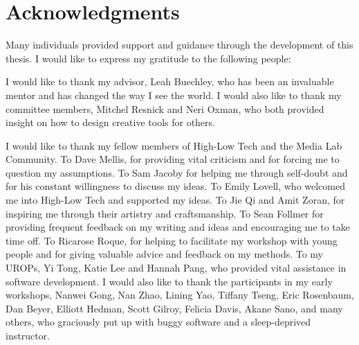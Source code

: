 \cleardoublepage
\setcounter{savepage}{\thepage}
\begin{abstractpage}

\end{abstractpage}




% 

\cleardoublepage

\section*{Acknowledgments}

Many individuals provided support and guidance through the development of this thesis. I would like to express my gratitude to the following people:

I would like to thank my advisor, Leah Buechley, who has been an invaluable mentor and has changed the way I see the world. I would also like to thank my committee members, Mitchel Resnick and Neri Oxman, who both provided insight on how to design creative tools for others.

I would like to thank my fellow members of High-Low Tech and the Media Lab Community. To Dave Mellis, for providing vital criticism and for forcing me to question my assumptions. To Sam Jacoby for helping me through self-doubt and for his constant willingness to discuss my ideas. To Emily Lovell, who welcomed me into High-Low Tech and supported my ideas. To Jie Qi and Amit Zoran, for inspiring me through their artistry and craftsmanship. To Sean Follmer for providing frequent feedback on my writing and ideas and encouraging me to take time off. To Ricarose Roque, for helping to facilitate my workshop with young people and for giving valuable advice and feedback on my methods. To my UROPs, Yi Tong, Katie Lee and Hannah Pang, who provided vital assistance in software development. I would also like to thank the participants in my early workshops, Nanwei Gong, Nan Zhao, Lining Yao, Tiffany Tseng, Eric Rosenbaum, Dan Beyer, Elliott Hedman, Scott Gilroy, Felicia Davis, Akane Sano, and many others, who graciously put up with buggy software and a sleep-deprived instructor.

